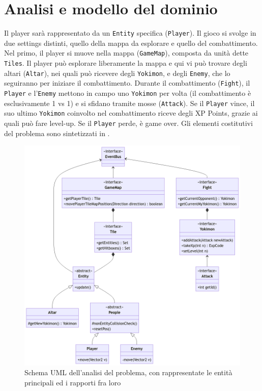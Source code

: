 \documentclass[a4paper,12pt]{report}
\begin{document}
\section{Analisi e modello del dominio}
Il player sarà rappresentato da un \texttt{Entity} specifica (\texttt{Player}).
%
Il gioco si svolge in due settings distinti, quello della mappa da esplorare e quello del combattimento.
%
Nel primo, il player si muove nella mappa (\texttt{GameMap}), composta da unità dette \texttt{Tiles}. Il player può esplorare liberamente la mappa e qui vi può trovare degli altari (\texttt{Altar}), nei quali può ricevere degli \texttt{Yokimon}, e degli \texttt{Enemy}, che lo seguiranno per iniziare il combattimento.
%
Durante il combattimento (\texttt{Fight}), il \texttt{Player} e l’\texttt{Enemy} mettono in campo uno \texttt{Yokimon} per volta (il combattimento è esclusivamente 1 vs 1) e si sfidano tramite mosse (\texttt{Attack}).
%
Se il \texttt{Player} vince, il suo ultimo \texttt{Yokimon} coinvolto nel combattimento riceve degli XP Points, grazie ai quali può fare level-up. 
%
Se il \texttt{Player} perde, è game over.
%
Gli elementi costitutivi del problema sono sintetizzati in .
\begin{figure}[H]
\centering{}
\includegraphics[width=1.0\columnwidth]{images/uml-1-2.png}
\caption{Schema UML dell’analisi del problema, con rappresentate le entità principali ed i rapporti fra loro}
\label{img:uml-main}
\end{figure}
\end{document}
